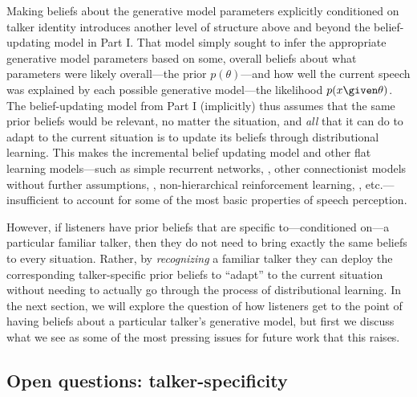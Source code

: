 \label{r2-talker-spec-novelty}
Making beliefs about the generative model parameters explicitly conditioned on talker identity introduces another level of structure above and beyond the belief-updating model in Part I.  That model simply sought to infer the appropriate generative model parameters based on some, overall beliefs about what parameters were likely overall---the prior $p(\theta)$---and how well the current speech was explained by each possible generative model---the likelihood $p(x \given \theta)$.  The belief-updating model from Part I (implicitly) thus assumes that the same prior beliefs would be relevant, no matter the situation, and \emph{all} that it can do to adapt to the current situation is to update its beliefs through distributional learning.  This makes the incremental belief updating model and other flat learning models---such as simple recurrent networks, \cite{Chang2006,Elman1990}, other connectionist models without further assumptions, \cite{Mirman2006,Lancia2013}, non-hierarchical reinforcement learning, \cite{Gallistel2001}, etc.---insufficient to account for some of the most basic properties of speech perception.

However, if listeners have prior beliefs that are specific to---conditioned on---a particular familiar talker, then they do not need to bring exactly the same beliefs to every situation.  Rather, by \emph{recognizing} a familiar talker they can deploy the corresponding talker-specific prior beliefs to ``adapt'' to the current situation without needing to actually go through the process of distributional learning.  In the next section, we will explore the question of how listeners get to the point of having beliefs about a particular talker's generative model, but first we discuss what we see as some of the most pressing issues for future work that this raises.

\subsection{Open questions: talker-specificity}
\label{sec:open-quest-talk}

